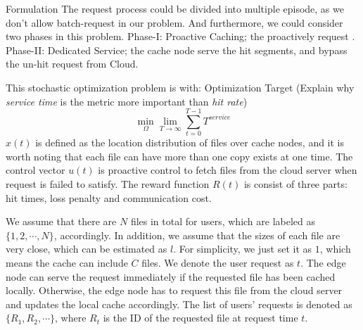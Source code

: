 \documentclass{article}
\begin{document}
\begin{section}{Formulation}
    The request process could be divided into multiple episode, as we don't allow batch-request in our problem.
    And furthermore, we could consider two phases in this problem.
    Phase-I: Proactive Caching; the proactively request .
    Phase-II: Dedicated Service; the cache node serve the hit segments, and bypass the un-hit request from Cloud.

    This stochastic optimization problem is with:
    Optimization Target (Explain why \emph{service time} is the metric more important than \emph{hit rate})
    $$
        \min_{\Omega}\lim_{T \to \infty} \sum_{t=0}^{T-1} T^{service}
    $$
    $x(t)$ is defined as the location distribution of files over cache nodes, and it is worth noting that each file can have more than one copy exists at one time. The control vector $u(t)$ is proactive control to fetch files from the cloud server when request is failed to satisfy. The reward function $R(t)$ is consist of three parts: hit times, loss penalty and communication cost.

    We assume that there are $N$ files in total for users, which are labeled as $\{1,2,\cdots,N\}$, accordingly. In addition, we assume that the sizes of each file are very close, which can be estimated as $l$. For simplicity, we just set it as $1$, which means the cache can include $C$ files. We denote the user request as $t$. The edge node can serve the request immediately if the requested file has been cached locally. Otherwise, the edge node has to request this file from the cloud server and updates the local cache accordingly. The list of users' requests is denoted as $\{R_1,R_2,\cdots\}$, where $R_t$ is the ID of the requested file at request time $t$.
\end{section}
\end{document}
